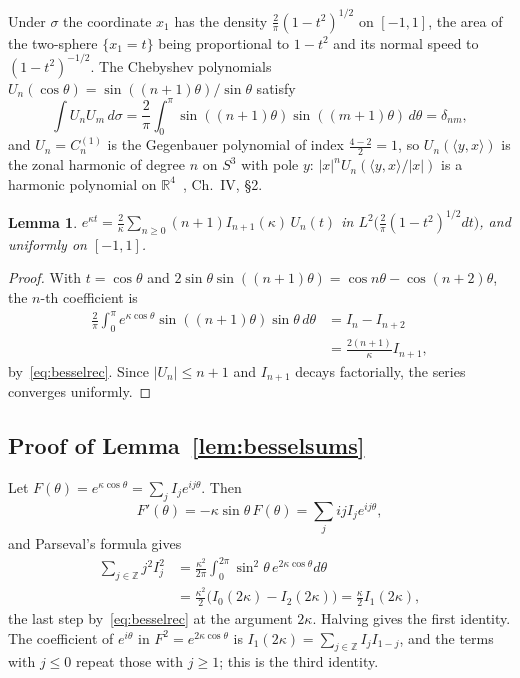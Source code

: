 \documentclass[aps,prd,twocolumn,superscriptaddress,nofootinbib,longbibliography,floatfix,amsmath,amssymb,10pt]{revtex4-2}
\newtheorem{lemma}[theorem]{Lemma}
\theoremstyle{definition}
\theoremstyle{remark}
\newcommand{\R}{\mathbb{R}}
\newcommand{\Z}{\mathbb{Z}}
\newcommand{\ip}[2]{\langle #1,#2\rangle}
\begin{document}
Under $\sigma$ the coordinate $x_1$ has the density $\frac2\pi(1-t^2)^{1/2}$
on $[-1,1]$, the area of the two-sphere $\{x_1=t\}$ being proportional to
$1-t^2$ and its normal speed to $(1-t^2)^{-1/2}$. The Chebyshev polynomials
$U_n(\cos\theta)=\sin((n+1)\theta)/\sin\theta$ satisfy
\[
\int U_nU_m\,d\sigma=\frac2\pi\int_0^\pi\sin((n+1)\theta)\sin((m+1)\theta)
\,d\theta=\delta_{nm},
\]
and $U_n=C_n^{(1)}$ is the Gegenbauer polynomial of index $\frac{4-2}2=1$, so
$U_n(\ip yx)$ is the zonal harmonic of degree $n$ on $S^3$ with pole $y$:
$|x|^nU_n(\ip yx/|x|)$ is a harmonic polynomial on $\R^4$~\cite{SW71},
Ch.~IV, \S2.

\begin{lemma}\label{lem:chebexp}
$e^{\kappa t}=\frac2\kappa\sum_{n\ge0}(n+1)I_{n+1}(\kappa)\,U_n(t)$ in
$L^2\bigl(\frac2\pi(1-t^2)^{1/2}dt\bigr)$, and uniformly on $[-1,1]$.
\end{lemma}

\begin{proof}
With $t=\cos\theta$ and $2\sin\theta\sin((n+1)\theta)=\cos n\theta-\cos(
n+2)\theta$, the $n$-th coefficient is
\[
\begin{aligned}
\frac2\pi\int_0^\pi e^{\kappa\cos\theta}\sin((n+1)\theta)\sin\theta\,d\theta
&=I_n-I_{n+2}\\
&=\frac{2(n+1)}\kappa I_{n+1},
\end{aligned}
\]
by~\eqref{eq:besselrec}. Since $|U_n|\le n+1$ and $I_{n+1}$ decays
factorially, the series converges uniformly.
\end{proof}

\subsection{Proof of Lemma~\ref{lem:besselsums}}

Let $F(\theta)=e^{\kappa\cos\theta}=\sum_jI_je^{ij\theta}$. Then
\[
F'(\theta)=-\kappa\sin\theta\,F(\theta)=\sum_jijI_je^{ij\theta},
\]
and Parseval's formula gives
\[
\begin{aligned}
\sum_{j\in\Z}j^2I_j^2&=\frac{\kappa^2}{2\pi}\int_0^{2\pi}\sin^2\theta\,
e^{2\kappa\cos\theta}d\theta\\
&=\frac{\kappa^2}2\bigl(I_0(2\kappa)-I_2(2\kappa)\bigr)=\frac\kappa2I_1(2\kappa),
\end{aligned}
\]
the last step by~\eqref{eq:besselrec} at the argument $2\kappa$. Halving gives
the first identity. The coefficient of $e^{i\theta}$ in $F^2=e^{2\kappa\cos
\theta}$ is $I_1(2\kappa)=\sum_{j\in\Z}I_jI_{1-j}$, and the terms with $j\le0$
repeat those with $j\ge1$; this is the third identity.
\end{document}
